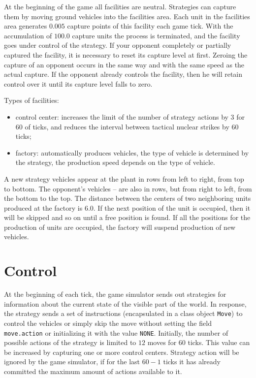 At the beginning of the game all facilities are neutral. Strategies can capture them by moving ground vehicles into the facilities area.
Each unit in the facilities area generates $0.005$ capture points of this facility each game tick. With the accumulation of $100.0$ capture units
the process is terminated, and the facility goes under control of the strategy. If your opponent completely or partially captured the facility,
it is necessary to reset its capture level at first. Zeroing the capture of an opponent occurs in the same way and with the same speed as the actual
capture. If the opponent already controls the facility, then he will retain control over it until its capture level falls
to zero.

Types of facilities:
\begin{itemize}
    \item control center: increases the limit of the number of strategy actions by $3$ for $60$ of ticks, and
          reduces the interval between tactical nuclear strikes by $60$ ticks;
    \item factory: automatically produces vehicles, the type of vehicle is determined by the strategy, the production speed depends on the type of vehicle.
\end{itemize}

A new strategy vehicles appear at the plant in rows from left to right, from top to bottom. The opponent’s vehicles – are also in rows, but from right to left, from the bottom to the top. The distance between the centers of two neighboring units produced at the factory is $6.0$. If the next position of the unit is occupied,
then it will be skipped and so on until a free position is found. If all the positions for the production of units are occupied, the factory
will suspend production of new vehicles.

\section{Control}

At the beginning of each tick, the game simulator sends out strategies for information about the current state of the visible part of the world. In response, the strategy sends a set of instructions (encapsulated in a class object \texttt{Move}) to control the vehicles or simply skip the move without setting the field
\texttt{move.action} or initializing it with the value \texttt{NONE}. Initially, the number of possible actions of the strategy is limited to $12$
moves for $60$ ticks. This value can be increased by capturing one or more control centers. Strategy action
will be ignored by the game simulator, if for the last $60 - 1$ ticks it has already committed the maximum amount of actions available to it.

